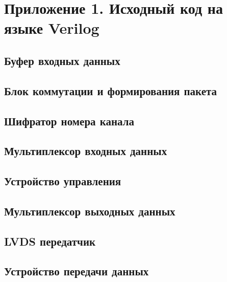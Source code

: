 \newpage

\section*{Приложение 1. Исходный код на языке Verilog}

\subsection*{Буфер входных данных}



\subsection*{Блок коммутации и формирования пакета}



\newpage

\subsection*{Шифратор номера канала}



\subsection*{Мультиплексор входных данных}



\subsection*{Устройство управления}



\subsection*{Мультиплексор выходных данных}



\newpage

\subsection*{LVDS передатчик}



\subsection*{Устройство передачи данных}



